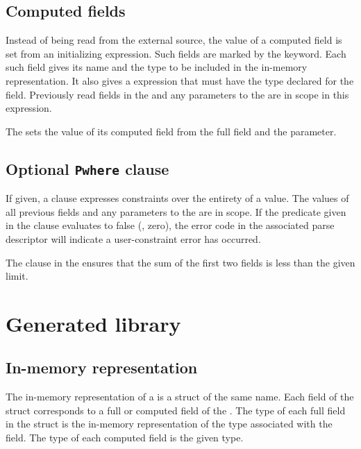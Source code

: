 \subsection{Computed fields}
\label{sec:structs-computed-fields}
Instead of being read from the external source, the value of a
computed field is set from an initializing expression.  Such fields
are marked by the \Pcompute{} keyword.  Each such field gives its name
and the \C{} type to be included in the in-memory representation.  It
also gives a \C{} expression that must have the type declared for the
field.  Previously read fields in the \Pstruct{} and any parameters
to the \Pstruct{} are in scope in this expression.

The  \Pstruct{} sets the value of its computed
field  from the full field  and the 
parameter. 



\subsection{Optional \texttt{Pwhere} clause}
If given, a \Pwhere{} clause expresses constraints over the entirety
of a \Pstruct{} value.  The values of all previous fields and any
parameters to the \Pstruct{} are in scope.  If the predicate given in
the \Pwhere{} clause evaluates to false (\ie{}, zero), the error code
in the associated parse descriptor will indicate a user-constraint
error has occurred.  

The \Pwhere{} clause in the  \Pstruct{} ensures
that the sum of the first two fields is less than the given limit.


\section{Generated library}
\subsection{In-memory representation}
\label{sec:structs-rep}
The in-memory representation of a \Pstruct{} is a \C{} struct of the
same name.  Each field of the \C{} struct corresponds to a full or
computed field of the \Pstruct{}.  The type of each full field in
the \C{} struct is the in-memory representation of the \PADSL{} type
associated with the field.  The type of each computed field is 
the given \C{} type. 

